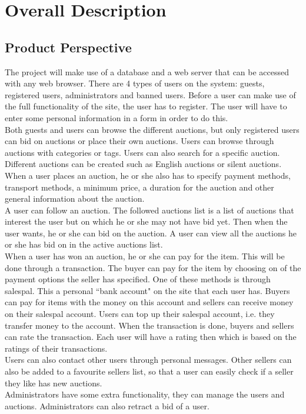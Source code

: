 \chapter{Overall Description}

\section{Product Perspective}
	The project will make use of a database and a web server that can be 
	accessed with any web browser. There are 4 types of users on the system:
	guests, registered users, administrators and banned users. Before a user can make use
	of the full functionality of the site, the user has to register. The user
	will have to enter some personal information in a form in order to do this.\\
	Both guests and users can browse the different auctions, but only registered 
	users can bid on auctions or place their own auctions. Users can browse through
	auctions with categories or tags. Users can also search for a  specific auction.\\
	Different auctions can be created such as English auctions\cite{English} or
	silent auctions\cite{silent}. When a user places an auction, he or she also has to specify
	payment methods, transport methods, a minimum price, a duration for the auction
	and other general information about the auction.\\
	A user can follow an auction. The followed auctions list is a list of auctions that interest the user
	but on which he or she may not have bid yet. Then when the user wants, he or she can bid on the auction.
	A user can view all the auctions he or she has bid on in the active auctions list.\\
	When a user has won an auction, he or she can pay for the item. This will be done through a 
	transaction. The buyer can pay for the item by choosing on of the payment options the seller 
	has specified. One of these methods is through salespal. This a personal ``bank account" on
	the site that each user has. Buyers can pay for items with the money on this account and 
	sellers can receive money on their salespal account. Users can top up their salespal account,
	i.e. they transfer money to the account. When the transaction is done, buyers and sellers 
	can rate the transaction. Each user will have a rating then which is based on the ratings
	of their transactions. \\
	Users can also contact other users through personal messages. Other sellers can also
	be added to a favourite sellers list, so that a user can easily check if a 
	seller they like has new auctions. \\
	Administrators have some extra functionality, they can manage the users 
	and auctions. Administrators can also retract a bid of a user.
